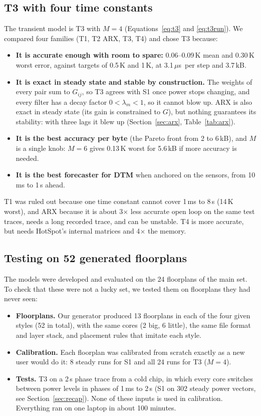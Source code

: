 \documentclass[11pt,a4paper]{article}
\newcommand{\us}{\,$\mu$s}
\begin{document}
\subsection{T3 with four time constants}
The transient model is T3 with $M=4$ (Equations~\eqref{eq:t3} and \eqref{eq:t3run}). We compared
four families (T1, T2 ARX, T3, T4) and chose T3 because:
\begin{itemize}
  \item \textbf{It is accurate enough with room to spare:} 0.06--0.09\,K mean and 0.30\,K worst
        error, against targets of 0.5\,K and 1\,K, at 3.1\us\ per step and 3.7\,kB.
  \item \textbf{It is exact in steady state and stable by construction.} The weights of every pair
        sum to $G_{ij}$, so T3 agrees with S1 once power stops changing, and every filter has a
        decay factor $0 < \lambda_m < 1$, so it cannot blow up. ARX is also exact in steady state
        (its gain is constrained to $G$), but nothing guarantees its stability: with three lags it
        blew up (Section~\ref{sec:arx}, Table~\ref{tab:arx}).
  \item \textbf{It is the best accuracy per byte} (the Pareto front from 2 to 6\,kB), and
        $M$ is a single knob: $M=6$ gives 0.13\,K worst for 5.6\,kB if more accuracy is needed.
  \item \textbf{It is the best forecaster for DTM} when anchored on the sensors, from 10\,ms to 1\,s
        ahead.
\end{itemize}
T1 was ruled out because one time constant cannot cover 1\,ms to 8\,s (14\,K worst), and ARX
because it is about 3$\times$ less accurate open loop on the same test traces, needs a long
recorded trace, and can be unstable. T4 is more accurate, but needs HotSpot's internal matrices and
4$\times$ the memory.

\subsection{Testing on 52 generated floorplans}\label{sec:gen}
The models were developed and evaluated on the 24 floorplans of the main set. To check that these
were not a lucky set, we tested them on floorplans they had never seen:
\begin{itemize}
  \item \textbf{Floorplans.} Our generator produced 13 floorplans in each of the four given styles
        (52 in total), with the same cores (2 big, 6 little), the same file format and layer
        stack, and placement rules that imitate each style.
  \item \textbf{Calibration.} Each floorplan was calibrated from scratch exactly as a new user would
        do it: 8 steady runs for S1 and all 24 runs for T3 ($M=4$).
  \item \textbf{Tests.} T3 on a 2\,s phase trace from a cold chip, in which every core switches
        between power levels in phases of 1\,ms to 2\,s (S1 on 302 steady power vectors, see
        Section~\ref{sec:recap}). None of these inputs is used in calibration. Everything ran on
        one laptop in about 100 minutes.
\end{itemize}
\end{document}
